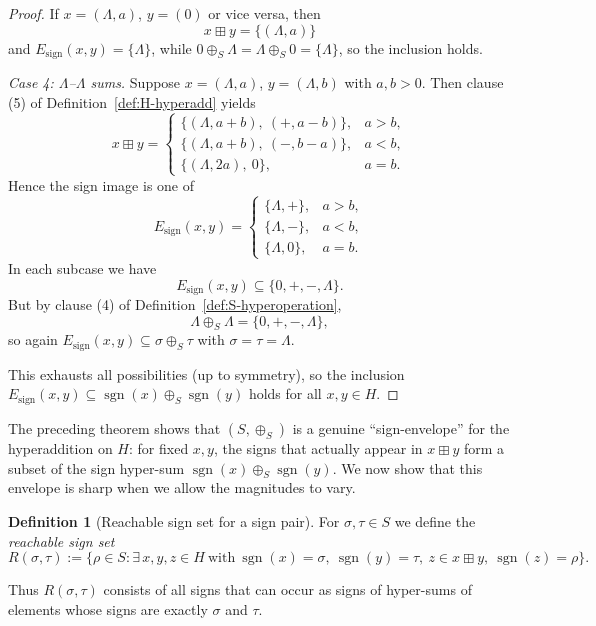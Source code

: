 \documentclass[11pt]{amsart}
\numberwithin{equation}{section}
\theoremstyle{definition}
\newtheorem{definition}[theorem]{Definition}
\theoremstyle{remark}
\newcommand{\Hnum}{H}                      %
\newcommand{\Sset}{S}                      %
\newcommand{\sgn}{\operatorname{sgn}}
\newcommand{\op}{\boxplus}                 %
\newcommand{\sop}{\oplus_S}                %
\begin{document}
\begin{proof}
If $x=(\Lambda,a)$, $y=(0)$ or vice versa, then
\[
  x\op y = \{(\Lambda,a)\}
\]
and $E_{\mathrm{sign}}(x,y)=\{\Lambda\}$, while
$0\sop\Lambda=\Lambda\sop0=\{\Lambda\}$, so the inclusion holds.

\smallskip\noindent
\emph{Case 4: $\Lambda$--$\Lambda$ sums.}  Suppose
$x=(\Lambda,a)$, $y=(\Lambda,b)$ with $a,b>0$.  Then clause (5) of
Definition~\ref{def:H-hyperadd} yields
\[
  x\op y
  =
  \begin{cases}
    \{(\Lambda,a+b),\ (+,a-b)\}, & a>b,\\[2pt]
    \{(\Lambda,a+b),\ (-,b-a)\}, & a<b,\\[2pt]
    \{(\Lambda,2a),\ 0\},        & a=b.
  \end{cases}
\]
Hence the sign image is one of
\[
  E_{\mathrm{sign}}(x,y)
  =
  \begin{cases}
    \{\Lambda,+\}, & a>b,\\[2pt]
    \{\Lambda,-\}, & a<b,\\[2pt]
    \{\Lambda,0\}, & a=b.
  \end{cases}
\]
In each subcase we have
\[
  E_{\mathrm{sign}}(x,y)\subseteq\{0,+,-,\Lambda\}.
\]
But by clause (4) of Definition~\ref{def:S-hyperoperation},
\[
  \Lambda\sop\Lambda = \{0,+,-,\Lambda\},
\]
so again $E_{\mathrm{sign}}(x,y)\subseteq\sigma\sop\tau$ with
$\sigma=\tau=\Lambda$.

\smallskip
This exhausts all possibilities (up to symmetry), so the inclusion
$E_{\mathrm{sign}}(x,y)\subseteq\sgn(x)\sop\sgn(y)$ holds for all
$x,y\in\Hnum$.
\end{proof}

The preceding theorem shows that $(\Sset,\sop)$ is a genuine
``sign-envelope'' for the hyperaddition on $\Hnum$: for fixed $x,y$,
the signs that actually appear in $x\op y$ form a subset of the sign
hyper-sum $\sgn(x)\sop\sgn(y)$.  We now show that this envelope is
sharp when we allow the magnitudes to vary.

\begin{definition}[Reachable sign set for a sign pair]
\label{def:reachable-sign-set}
For $\sigma,\tau\in\Sset$ we define the \emph{reachable sign set}
\[
  R(\sigma,\tau)
  := \{\rho\in\Sset : \exists\,x,y,z\in\Hnum\ \text{with}\ 
      \sgn(x)=\sigma,\ \sgn(y)=\tau,\ z\in x\op y,\ \sgn(z)=\rho\}.
\]
\end{definition}

Thus $R(\sigma,\tau)$ consists of all signs that can occur as signs of
hyper-sums of elements whose signs are exactly $\sigma$ and $\tau$.
\end{document}
